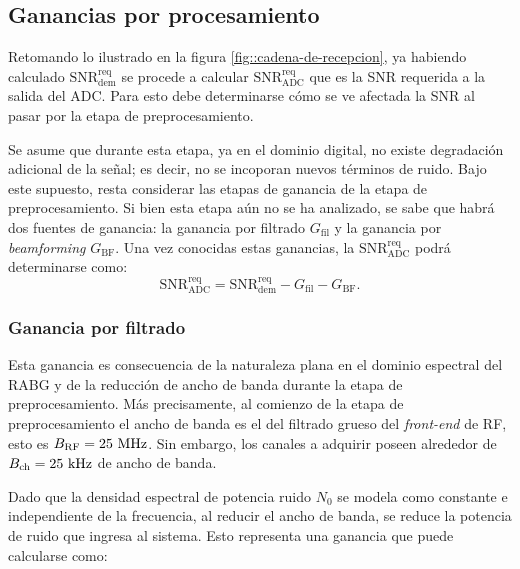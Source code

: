 \documentclass[../../main.tex]{subfiles}
\begin{document}

\subsection{Ganancias por procesamiento}
Retomando lo ilustrado en la figura \ref{fig::cadena-de-recepcion}, ya habiendo calculado $\textrm{SNR}^\textrm{req}_\textrm{dem}$ se procede a calcular $\textrm{SNR}^\textrm{req}_\textrm{ADC}$ que es la SNR requerida a la salida del ADC. Para esto debe determinarse cómo se ve afectada la SNR al pasar por la etapa de preprocesamiento.

Se asume que durante esta etapa, ya en el dominio digital, no existe degradación adicional de la señal; es decir, no se incoporan nuevos términos de ruido. 
Bajo este supuesto, resta considerar las etapas de ganancia de la etapa de preprocesamiento. 
Si bien esta etapa aún no se ha analizado, se sabe que habrá dos fuentes de ganancia: la ganancia por filtrado $G_\textrm{fil}$ y la ganancia por \textit{beamforming} $G_\textrm{BF}$. Una vez conocidas estas ganancias, la $\textrm{SNR}^\textrm{req}_\textrm{ADC}$ podrá determinarse como:
\begin{equation}
    \textrm{SNR}^\textrm{req}_\textrm{ADC} = \textrm{SNR}^\textrm{req}_\textrm{dem} - G_\textrm{fil} - G_\textrm{BF}.
    \label{eq::SRN2SNR}
\end{equation}

\subsubsection{Ganancia por filtrado}
Esta ganancia es consecuencia de la naturaleza plana en el dominio espectral del RABG y de la reducción de ancho de banda durante la etapa de preprocesamiento. Más precisamente, al comienzo de la etapa de preprocesamiento el ancho de banda es el del filtrado grueso del \textit{front-end} de RF, esto es $B_\textrm{RF} = 25~\textrm{MHz}$. Sin embargo, los canales a adquirir poseen alrededor de $B_\textrm{ch} = 25~\textrm{kHz}$ de ancho de banda. 

Dado que la densidad espectral de potencia ruido $N_0$ se modela como constante e independiente de la frecuencia, al reducir el ancho de banda, se reduce la potencia de ruido que ingresa al sistema. Esto representa una ganancia que puede calcularse como:
\end{document}
